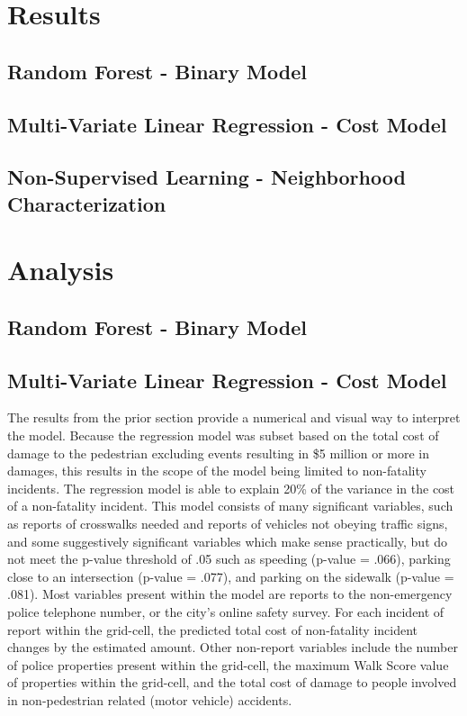 \documentclass{llncs}
\begin{document}
\section{Results}
%

\subsection{Random Forest - Binary Model}

\subsection{Multi-Variate Linear Regression - Cost Model}

\subsection{Non-Supervised Learning - Neighborhood Characterization}

%
\section{Analysis}
%

\subsection{Random Forest - Binary Model}

\subsection{Multi-Variate Linear Regression - Cost Model}
The results from the prior section provide a numerical and visual way to interpret the model. Because the regression model was subset based on the total cost of damage to the pedestrian excluding events resulting in \$5 million or more in damages, this results in the scope of the model being limited to non-fatality incidents. The regression model is able to explain 20\% of the variance in the cost of a non-fatality incident. This model consists of many significant variables, such as reports of crosswalks needed and reports of vehicles not obeying traffic signs, and some suggestively significant variables which make sense practically, but do not meet the p-value threshold of .05 such as speeding (p-value = .066), parking close to an intersection (p-value = .077), and parking on the sidewalk (p-value = .081). Most variables present within the model are reports to the non-emergency police telephone number, or the city’s online safety survey. For each incident of report within the grid-cell, the predicted total cost of non-fatality incident changes by the estimated amount. Other non-report variables include the number of police properties present within the grid-cell, the maximum Walk Score value of properties within the grid-cell, and the total cost of damage to people involved in non-pedestrian related (motor vehicle) accidents. 
\end{document}
